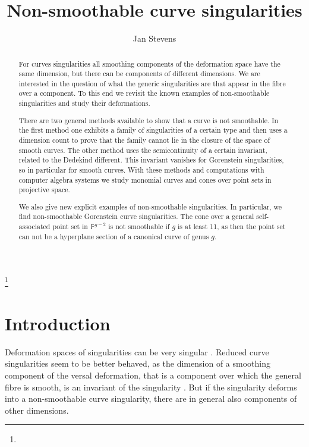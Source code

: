 \documentclass{amsart}
\theoremstyle{definition}
\theoremstyle{remark}
\begin{document}
\title{Non-smoothable curve singularities}




\author{Jan Stevens}
\address{\scriptsize  Department of Mathematical Sciences,  Chalmers University of
Technology and University of Gothenburg.
SE 412 96 Gothenburg, Sweden}


\begin{abstract}
For curves  singularities  all smoothing components  of  the deformation space
have the same dimension, but there can be components of different dimensions.               
%
We are interested in the question of what the generic singularities are
that appear in the fibre over a component.  
To this end we revisit the known examples of non-smoothable
singularities and study their deformations. 

There are two general methods available to show that a curve is not smoothable.
In the first method one exhibits a family of singularities of a certain type
and then uses a dimension count to prove that the family cannot lie in the
closure of the space of smooth curves. The other method  uses the semicontinuity of a certain invariant, related to the Dedekind
different. This invariant vanishes for Gorenstein singularities, so in particular for
smooth curves. With these methods and computations with computer algebra systems 
we study monomial curves and cones over point sets in projective space.

We also give new explicit examples
of non-smoothable singularities. In particular, we find non-smoothable
Gorenstein curve singularities. The cone over a general self-associated point set
in $\mathbb P^{g-2}$ is not smoothable if $g$ 
is at least 11, as then the point set can
not be a hyperplane section of a canonical curve of genus $g$.
\end{abstract}

\thanks{}
\maketitle


\section*{Introduction}
Deformation spaces of singularities can be very singular \cite{Va}. 
Reduced curve singularities seem to be better behaved, as the dimension of a smoothing component
of the versal deformation, that is a component over which the general fibre is smooth,
is an invariant of the singularity \cite{De}.
But  if the  singularity deforms
into a non-smoothable curve singularity,
there are in general also components of other dimensions.
\end{document}
